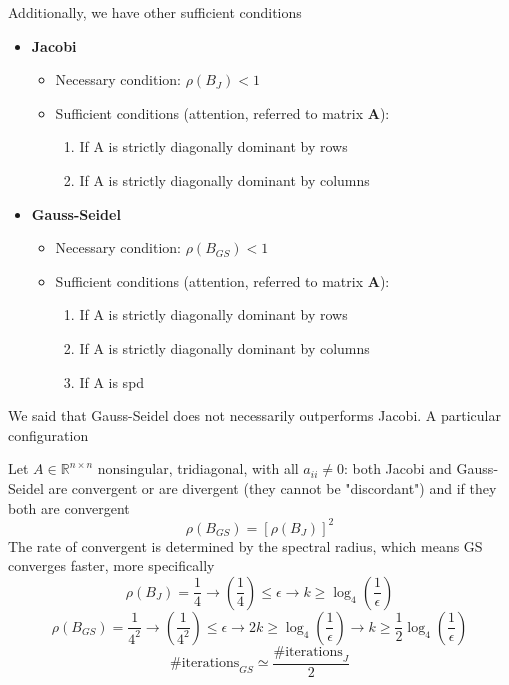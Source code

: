     Additionally, we have other sufficient conditions
    \begin{itemize}
        \item \textbf{Jacobi}
        \begin{itemize}
            \item Necessary condition: $\rho(B_J)<1$
            \item Sufficient conditions (attention, referred to matrix \textbf{A}):
            \begin{enumerate}
                \item If A is strictly diagonally dominant by rows
                \item If A is strictly diagonally dominant by columns
            \end{enumerate}
        \end{itemize}
        \item \textbf{Gauss-Seidel}
        \begin{itemize}
            \item Necessary condition: $\rho(B_{GS})<1$
            \item Sufficient conditions (attention, referred to matrix \textbf{A}):
            \begin{enumerate}
                \item If A is strictly diagonally dominant by rows
                \item If A is strictly diagonally dominant by columns
                \item If A is spd
            \end{enumerate}
        \end{itemize}
    \end{itemize}
    We said that Gauss-Seidel does not necessarily outperforms Jacobi. A particular configuration

    Let $A\in\mathbb{R}^{n\times n}$ nonsingular, tridiagonal, with all $a_{ii}\neq 0$: both Jacobi and Gauss-Seidel are convergent or are divergent (they cannot be "discordant") and if they both are convergent
    $$
    \rho(B_{GS})=\left[\rho(B_J)\right]^2
    $$
    The rate of convergent is determined by the spectral radius, which means GS converges faster, more specifically
    $$
    \rho(B_J)=\frac{1}{4}\rightarrow \left(
        \frac{1}{4}
    \right)\leq \epsilon
    \rightarrow k\geq \log_4\left(\frac{1}{\epsilon}\right)
    $$
    $$
    \rho(B_{GS})=\frac{1}{4^2}\rightarrow \left(
        \frac{1}{4^2}
    \right)\leq \epsilon
    \rightarrow 2k\geq \log_4\left(\frac{1}{\epsilon}\right)
    \rightarrow k\geq \frac{1}{2}\log_4\left(\frac{1}{\epsilon}\right)
    $$
    $$
    \text{\#iterations}_{GS}\simeq
    \frac{\text{\#iterations}_{J}}{2}
    $$

